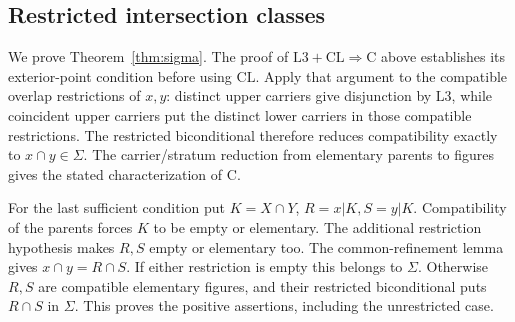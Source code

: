 \subsection{Restricted intersection classes}
We prove Theorem~\ref{thm:sigma}. The proof of
$\mathrm L3+\mathrm{CL}\Rightarrow\mathrm C$ above establishes
its exterior-point condition before using $\mathrm{CL}$.
Apply that argument to the compatible overlap restrictions of
$x,y$: distinct upper carriers give disjunction by $\mathrm L3$,
while coincident upper carriers put the distinct lower carriers
in those compatible restrictions. The restricted biconditional
therefore reduces compatibility exactly to $x\cap y\in\Sigma$.
The carrier/stratum reduction from elementary parents to figures
gives the stated characterization of $\mathrm C$.

For the last sufficient condition put $K=X\cap Y$,
$R=x|K,S=y|K$. Compatibility of the parents forces $K$ to be
empty or elementary. The additional restriction hypothesis makes
$R,S$ empty or elementary too. The common-refinement lemma gives
$x\cap y=R\cap S$. If either restriction is empty this belongs to
$\Sigma$. Otherwise $R,S$ are compatible elementary figures,
and their restricted biconditional puts $R\cap S$ in $\Sigma$.
This proves the positive assertions, including the unrestricted case.

